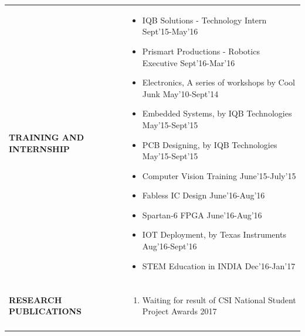 \documentclass[a4paper]{article}
\begin{document}
\begin{longtable}{@{}m{3.0cm}m{14cm}@{}}
			
			\textrm{\textbf{TRAINING \newline AND \newline  INTERNSHIP}} & 
				\begin{itemize}
					\itemsep -2pt
					\item
					IQB Solutions - Technology Intern \hfill  Sept'15-May'16
					\item
					Prismart Productions - Robotics Executive \hfill  Sept'16-Mar'16
					\item
					Electronics, A series of workshops by Cool Junk \hfill  May'10-Sept'14
					\item
					Embedded Systems, by IQB Technologies \hfill  May'15-Sept'15
					\item
					PCB Designing, by IQB Technologies \hfill  May'15-Sept'15
					\item
					Computer Vision Training \hfill  June'15-July'15
					\item
					Fabless IC Design \hfill  June'16-Aug'16
					\item
					Spartan-6 FPGA \hfill  June'16-Aug'16
					\item
					IOT Deployment, by Texas Instruments \hfill  Aug'16-Sept'16
					\item
					STEM Education in INDIA \hfill  Dec'16-Jan'17
				\end{itemize}
			\\ \\
			
			
			\textrm{\textbf {RESEARCH \newline PUBLICATIONS}} & 
				\begin{enumerate}
					\itemsep -2pt
					\item
					Waiting for result of CSI National Student Project Awards 2017
				\end{enumerate}
			\\ \\
			

\end{longtable}
\end{document}
